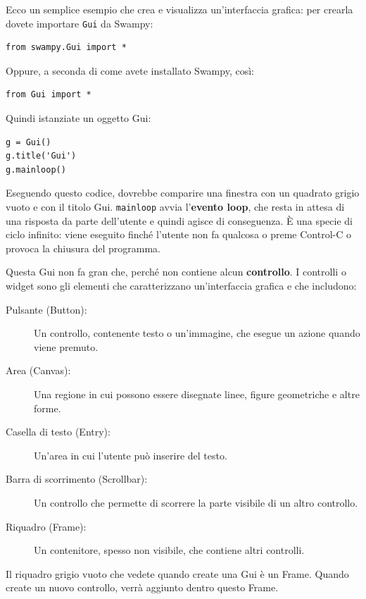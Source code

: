 \documentclass[10pt]{book}
\begin{document}
Ecco un semplice esempio che crea e visualizza un'interfaccia grafica: per crearla dovete importare {\tt Gui} da Swampy:
%
\begin{verbatim}
from swampy.Gui import *
\end{verbatim}
%
Oppure, a seconda di come avete installato Swampy, così:
%
\begin{verbatim}
from Gui import *
\end{verbatim}
%
Quindi istanziate un oggetto Gui:
%
\begin{verbatim}
g = Gui()
g.title('Gui')
g.mainloop()
\end{verbatim}
%
Eseguendo questo codice, dovrebbe comparire una finestra con un quadrato grigio vuoto e con il titolo {\sf Gui}.  {\tt mainloop} avvia l'{\bf evento
  loop}, che resta in attesa di una risposta da parte dell'utente e quindi agisce di conseguenza. È una specie di ciclo infinito: viene eseguito finché l'utente non fa qualcosa o preme Control-C o provoca la chiusura del programma.

Questa Gui non fa gran che, perché non contiene alcun
{\bf controllo}. I controlli o widget sono gli elementi che caratterizzano un'interfaccia grafica e che includono:

\begin{description}

\item[Pulsante (Button):] Un controllo, contenente testo o un'immagine, che esegue un azione quando viene premuto.

\item[Area (Canvas):] Una regione in cui possono essere disegnate linee, figure geometriche e altre forme.

\item[Casella di testo (Entry):] Un'area in cui l'utente può inserire del testo.

\item[Barra di scorrimento (Scrollbar):] Un controllo che permette di scorrere la parte visibile di un altro controllo.

\item[Riquadro (Frame):] Un contenitore, spesso non visibile, che contiene altri controlli.

\end{description}

Il riquadro grigio vuoto che vedete quando create una Gui è un Frame. Quando create un nuovo controllo, verrà aggiunto dentro questo Frame.
\end{document}
